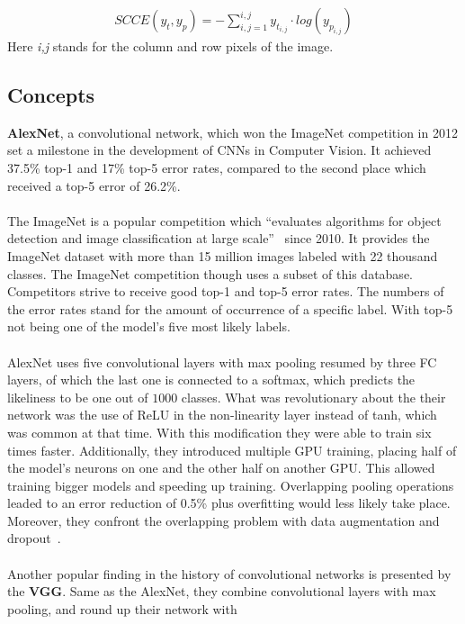 \begin{align}
    SCCE(y_t,y_p) = -\sum_{i,j=1}^{i,j}y_{t_{i,j}}\cdot log(y_{p_{i,j}})
\end{align}
Here \textit{i,j} stands for the column and row pixels of the image.


\subsection{Concepts}


\textbf{AlexNet}, a convolutional network, which won the \gls{ImageNet} competition in 2012 set a milestone in the development
of \glspl{CNN} in Computer Vision.
It achieved 37.5\% top-1 and 17\% top-5 error rates, compared to the second place which received a top-5 error
of 26.2\%.
\\\mbox{}\\
The \gls{ImageNet} is a popular competition which
\enquote{evaluates algorithms for object detection and image classification at large scale}~\cite{ILSVRC15}
since 2010.
It provides the ImageNet dataset with more than 15 million images labeled with 22 thousand classes.
The \gls{ImageNet} competition though uses a subset of this database.
Competitors strive to receive good top-1 and top-5 error rates.
The numbers of the error rates stand for the amount of occurrence of a specific label.
With top-5 not being one of the model's five most likely labels.
\\\mbox{}\\
AlexNet uses five convolutional layers with max pooling resumed by three \gls{FC} layers, of which the last one
is connected to a softmax, which predicts the likeliness to be one out of $1000$ classes.
What was revolutionary about the their network was the use of \gls{ReLU} in the non-linearity layer instead of tanh,
which was common at that time.
With this modification they were able to train six times faster.
Additionally, they introduced multiple GPU training, placing half of the model's neurons on one and the other half
on another GPU.
This allowed training bigger models and speeding up training.
Overlapping pooling operations leaded to an error reduction of 0.5\% plus overfitting would less likely take place.
Moreover, they confront the overlapping problem with data augmentation and dropout~\cite{advanceddeeplearningpython, alexnet}.
\\\mbox{}\\
Another popular finding in the history of convolutional networks is presented by the \textbf{\gls{VGG}}.
Same as the AlexNet, they combine convolutional layers with max pooling, and round up their network with
